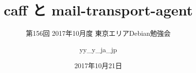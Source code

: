 




\documentclass[cjk,dvipdfmx,12pt]{beamer}
\usepackage{monthlypresentation}



\title{caff と mail-transport-agent}
\subtitle{第156回 2017年10月度 東京エリアDebian勉強会}
\author{yy\_y\_ja\_jp}
\date{2017年10月21日}



